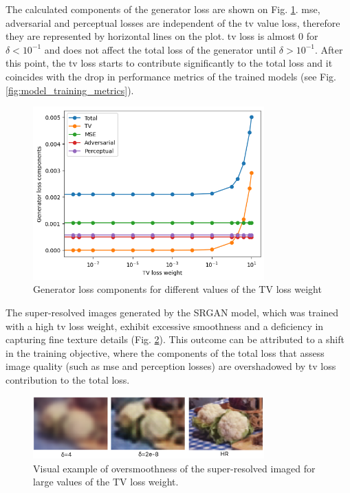 \documentclass[conference]{IEEEtran}
\begin{document}
The calculated components of the generator loss are shown on Fig. \ref{fig:tv_loss_components}. \acrshort{mse}, adversarial and perceptual losses are independent of the \acrshort{tv} value loss, therefore they are represented by horizontal lines on the plot. \Acrshort{tv} loss is almost 0 for $\delta < 10^{-1}$ and does not affect the total loss of the generator until $\delta > 10^{-1}$. After this point, the \acrshort{tv} loss starts to contribute significantly to the total loss and it coincides with the drop in performance metrics of the trained models (see Fig. \ref{fig:model_training_metrics}).

\begin{figure}[htb]
	\centering
    \centerline{\includegraphics[width=8.9cm]{results/tv_loss_components}}
	\caption{Generator loss components for different values of the TV loss weight}
	\label{fig:tv_loss_components}
\end{figure}

The super-resolved images generated by the SRGAN model, which was trained with a high \acrlong{tv} loss weight, exhibit excessive smoothness and a deficiency in capturing fine texture details (Fig. \ref{fig:tv_smooth_comparison}). This outcome can be attributed to a shift in the training objective, where the components of the total loss that assess image quality (such as \acrshort{mse} and perception losses) are overshadowed by \acrshort{tv} loss contribution to the total loss.

\begin{figure}[htb]
	\centering
    \centerline{\includegraphics[width=8.9cm]{results/tv_smooth_comparison}}
	\caption{Visual example of oversmoothness of the super-resolved imaged for large values of the TV loss weight.}
	\label{fig:tv_smooth_comparison}
\end{figure}
\end{document}
